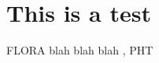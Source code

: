 \documentclass[10pt]{article}
\begin{document}
\section{This is a test}
FLORA blah blah blah \cite{FLORA}, PHT \cite{PHT}



\end{document}
